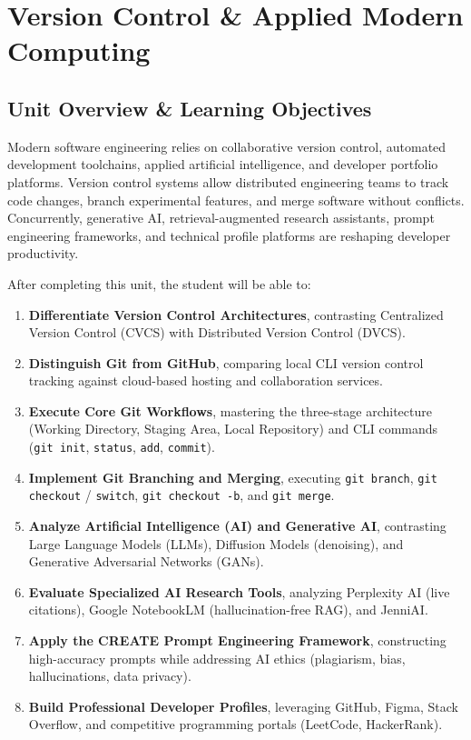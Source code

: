\chapter{Version Control \& Applied Modern Computing}
\label{chap:version-control}

\section{Unit Overview \& Learning Objectives}

Modern software engineering relies on collaborative version control, automated development toolchains, applied artificial intelligence, and developer portfolio platforms. Version control systems allow distributed engineering teams to track code changes, branch experimental features, and merge software without conflicts. Concurrently, generative AI, retrieval-augmented research assistants, prompt engineering frameworks, and technical profile platforms are reshaping developer productivity.

\begin{important}
After completing this unit, the student will be able to:
\begin{enumerate}[leftmargin=1.5em]
    \item \textbf{Differentiate Version Control Architectures}, contrasting Centralized Version Control (CVCS) with Distributed Version Control (DVCS).
    \item \textbf{Distinguish Git from GitHub}, comparing local CLI version control tracking against cloud-based hosting and collaboration services.
    \item \textbf{Execute Core Git Workflows}, mastering the three-stage architecture (Working Directory, Staging Area, Local Repository) and CLI commands (\texttt{git init}, \texttt{status}, \texttt{add}, \texttt{commit}).
    \item \textbf{Implement Git Branching and Merging}, executing \texttt{git branch}, \texttt{git checkout} / \texttt{switch}, \texttt{git checkout -b}, and \texttt{git merge}.
    \item \textbf{Analyze Artificial Intelligence (AI) and Generative AI}, contrasting Large Language Models (LLMs), Diffusion Models (denoising), and Generative Adversarial Networks (GANs).
    \item \textbf{Evaluate Specialized AI Research Tools}, analyzing Perplexity AI (live citations), Google NotebookLM (hallucination-free RAG), and JenniAI.
    \item \textbf{Apply the CREATE Prompt Engineering Framework}, constructing high-accuracy prompts while addressing AI ethics (plagiarism, bias, hallucinations, data privacy).
    \item \textbf{Build Professional Developer Profiles}, leveraging GitHub, Figma, Stack Overflow, and competitive programming portals (LeetCode, HackerRank).
\end{enumerate}
\end{important}

